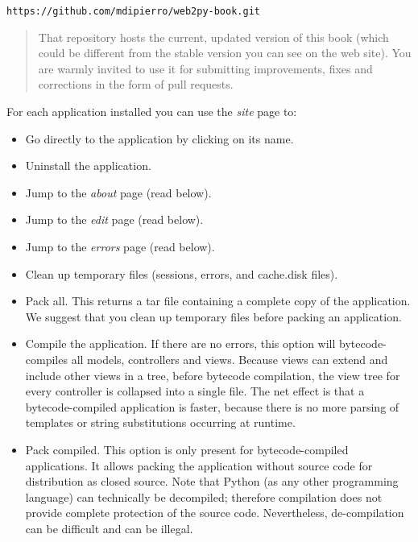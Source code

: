 \documentclass[justified,sixbynine,notoc]{tufte-book}
\begin{document}
\begin{fullwidth}
\begin{lstlisting}[keywords={}]
https://github.com/mdipierro/web2py-book.git
\end{lstlisting}

\begin{quote}That repository hosts the current, updated version of this book (which could be different from the stable version you can see on the web site). You are warmly invited to use it for submitting
improvements, fixes and corrections in the form of pull requests.\end{quote}
For each application installed you can use the {\it site} page to:
\begin{itemize}
\item Go directly to the application by clicking on its name.

\item Uninstall the application.

\item Jump to the {\it about} page (read below).

\item Jump to the {\it edit} page (read below).

\item Jump to the {\it errors} page (read below).

\item Clean up temporary files (sessions, errors, and cache.disk files).

\item Pack all. This returns a tar file containing a complete copy of the application. We suggest that you clean up temporary files before packing an application.

\item Compile the application. If there are no errors, this option will bytecode-compiles all models, controllers and views. Because views can extend and include other views in a tree, before bytecode compilation, the view tree for every controller is collapsed into a single file. The net effect is that a bytecode-compiled application is faster, because there is no more parsing of templates or string substitutions occurring at runtime.

\item Pack compiled. This option is only present for bytecode-compiled applications. It allows packing the application without source code for distribution as closed source. Note that Python (as any other programming language) can technically be decompiled; therefore compilation does not provide complete protection of the source code. Nevertheless, de-compilation can be difficult and can be illegal.


\end{itemize}
\end{fullwidth}
\end{document}
